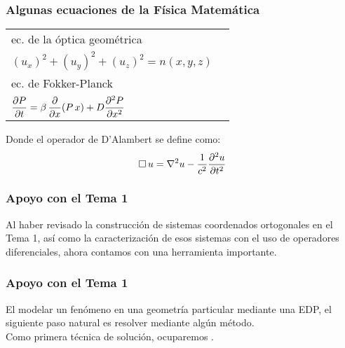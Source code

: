 \documentclass[12pt]{beamer}
\begin{document}
\begin{frame}
\frametitle{Algunas ecuaciones de la Física Matemática}
\begin{table}
\renewcommand{\arraystretch}{1.5}
\begin{tabular}{l@{\hskip 1cm} l@{\hskip 2cm}}
ec. de la óptica geométrica & \\
$(u_{x})^{2} + (u_{y})^{2} + (u_{z})^{2} =  n (x, y, z)$ &  \pause \\
ec. de Fokker-Planck & \\
$\displaystyle \pdv{P}{t} = \beta \, \displaystyle \pdv{x} (P \, x) +  D \displaystyle \pdv[2]{P}{x}$ & 
\end{tabular}
\end{table}
\pause
Donde el operador de D'Alambert se define como:
\begin{align*}
\square \, u = \laplacian{u} - \dfrac{1}{c^{2}} \pdv[2]{u}{t}
\end{align*}
\end{frame}
\begin{frame}
\frametitle{Apoyo con el Tema 1}
Al haber revisado la construcción de sistemas coordenados ortogonales en el Tema 1, así como la caracterización de esos sistemas con el uso de operadores diferenciales, ahora contamos con una herramienta importante.
\end{frame}
\begin{frame}
\frametitle{Apoyo con el Tema 1}
El modelar un fenómeno en una geometría particular mediante una EDP, el siguiente paso natural es resolver mediante algún método.
\\
\bigskip
\pause
Como primera técnica de solución, ocuparemos .
\end{frame}
\end{document}
